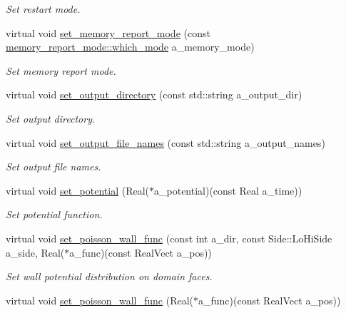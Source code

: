 \begin{DoxyCompactItemize}
\begin{DoxyCompactList}\small\item\em Set restart mode. \end{DoxyCompactList}\item 
virtual void \hyperlink{classplasma__engine_aeea53dac8294171ca41eeb6a5f75a7cf}{set\+\_\+memory\+\_\+report\+\_\+mode} (const \hyperlink{namespacememory__report__mode_a7a376e3e2cdf985fc8a6d33aa68c6f44}{memory\+\_\+report\+\_\+mode\+::which\+\_\+mode} a\+\_\+memory\+\_\+mode)
\begin{DoxyCompactList}\small\item\em Set memory report mode. \end{DoxyCompactList}\item 
virtual void \hyperlink{classplasma__engine_a29357d71e74cd49d43c8bacf98923904}{set\+\_\+output\+\_\+directory} (const std\+::string a\+\_\+output\+\_\+dir)
\begin{DoxyCompactList}\small\item\em Set output directory. \end{DoxyCompactList}\item 
virtual void \hyperlink{classplasma__engine_aef72a257f4992f1a6abd61bb439500b8}{set\+\_\+output\+\_\+file\+\_\+names} (const std\+::string a\+\_\+output\+\_\+names)
\begin{DoxyCompactList}\small\item\em Set output file names. \end{DoxyCompactList}\item 
virtual void \hyperlink{classplasma__engine_a7a9707958e922b3c5dc43ecb284ca2a4}{set\+\_\+potential} (Real($\ast$a\+\_\+potential)(const Real a\+\_\+time))
\begin{DoxyCompactList}\small\item\em Set potential function. \end{DoxyCompactList}\item 
virtual void \hyperlink{classplasma__engine_a7a575594478c4332a8d44600c7081111}{set\+\_\+poisson\+\_\+wall\+\_\+func} (const int a\+\_\+dir, const Side\+::\+Lo\+Hi\+Side a\+\_\+side, Real($\ast$a\+\_\+func)(const Real\+Vect a\+\_\+pos))
\begin{DoxyCompactList}\small\item\em Set wall potential distribution on domain faces. \end{DoxyCompactList}\item 
virtual void \hyperlink{classplasma__engine_acd39bad4bdf884abbf929784ae226a10}{set\+\_\+poisson\+\_\+wall\+\_\+func} (Real($\ast$a\+\_\+func)(const Real\+Vect a\+\_\+pos))

\end{DoxyCompactItemize}
